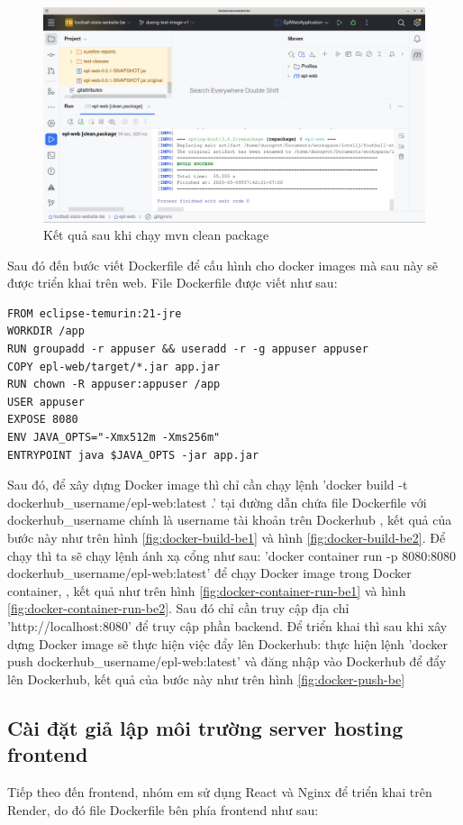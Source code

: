 \documentclass[../BTL.tex]{subfiles}
\begin{document}
\begin{figure}
    \centering
    \includegraphics[width=1\linewidth]{Hinhve/mvn-clean-package.png}
    \caption{ Kết quả sau khi chạy mvn clean package}
    \label{fig:mvn-clean-package}
\end{figure}


Sau đó đến bước viết Dockerfile để cấu hình cho docker images mà sau này sẽ được triển khai trên web. File Dockerfile được viết như sau:
\begin{verbatim}
FROM eclipse-temurin:21-jre
WORKDIR /app
RUN groupadd -r appuser && useradd -r -g appuser appuser
COPY epl-web/target/*.jar app.jar
RUN chown -R appuser:appuser /app
USER appuser
EXPOSE 8080
ENV JAVA_OPTS="-Xmx512m -Xms256m"
ENTRYPOINT java $JAVA_OPTS -jar app.jar
\end{verbatim}

Sau đó, để xây dựng Docker image thì chỉ cần chạy lệnh 
'docker build -t dockerhub\_username/epl-web:latest .' tại đường dẫn chứa file Dockerfile với dockerhub\_username chính là username tài khoản trên Dockerhub , kết quả của bước này như trên hình \ref{fig:docker-build-be1} và hình \ref{fig:docker-build-be2}. Để chạy thì ta sẽ chạy lệnh ánh xạ cổng như sau: 'docker container run -p 8080:8080 dockerhub\_username/epl-web:latest' để chạy Docker image trong Docker container, , kết quả như trên hình \ref{fig:docker-container-run-be1} và hình \ref{fig:docker-container-run-be2}. Sau đó chỉ cần truy cập địa chỉ 'http://localhost:8080' để truy cập phần backend. Để triển khai thì sau khi xây dựng Docker image sẽ thực hiện việc đẩy lên Dockerhub: thực hiện lệnh 'docker push dockerhub\_username/epl-web:latest' và đăng nhập vào Dockerhub để đẩy lên Dockerhub, kết quả của bước này như trên hình \ref{fig:docker-push-be}

\subsection{ Cài đặt giả lập môi trường server hosting frontend}
Tiếp theo đến frontend, nhóm em sử dụng React và Nginx để triển khai trên Render, do đó file Dockerfile bên phía frontend như sau:
\end{document}
